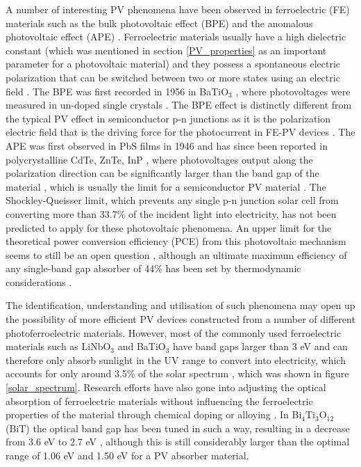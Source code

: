 A number of interesting PV phenomena have been observed in ferroelectric (FE) materials  such as the bulk photovoltaic effect (BPE) and the anomalous photovoltaic effect (APE) \cite{keith}. Ferroelectric materials usually have a high dielectric constant (which was mentioned in section \ref{PV_properties} as an important parameter for a photovoltaic material) and they possess a spontaneous electric polarization that can be switched between two or more states using an electric field \cite{new_FE_PV_1}.
The BPE was first recorded in 1956 in BaTiO$_3$ \cite{keith_46}, where photovoltages were measured in un-doped single crystals \cite{keith}.
The BPE effect is distinctly different from the typical PV effect in semiconductor
p-n junctions as it is the polarization electric field that is the driving force for the photocurrent in FE-PV devices \cite{FE_PV_rev1}. 
The APE was first observed in PbS films in 1946 \cite{keith_54} and has since been reported in polycrystalline CdTe, ZnTe, InP \cite{keith_55, keith_56, keith_57}, where photovoltages output along the polarization direction can be significantly larger than the band gap of the material \cite{FE_PV_rev1}, which is usually the limit for a semiconductor PV material \cite{keith}. 
The Shockley-Queisser limit, which prevents any single p-n junction solar cell from converting more than 33.7\% of the incident light into electricity, has not been predicted to apply for these photovoltaic phenomena. An upper limit for the theoretical power conversion efficiency (PCE) from this photovoltaic mechanism seems to still be an open question \cite{new_FE_PV}, although an ultimate maximum efficiency of any single-band gap absorber of 44\% has been set by thermodynamic considerations \cite{SQ_1961}. %

The identification, understanding and utilisation of such phenomena may open up the possibility of more efficient PV devices constructed from a number of different photoferroelectric materials. However, most of the commonly used ferroelectric materials such as LiNbO$_3$ and BaTiO$_3$ have band gaps larger than 3 eV and can therefore only absorb sunlight in the UV range to convert into electricity, which accounts for only around 3.5\% of the solar spectrum \cite{FE_PV_rev1}, which was shown in figure \ref{solar_spectrum}. Research efforts have also gone into adjusting the optical absorption of ferroelectric materials without influencing the ferroelectric properties of the material through chemical doping or alloying \cite{FE_PV_rev1}. In Bi$_4$Ti$_3$O$_{12}$ (BiT) the optical band gap has been tuned in such a way, resulting in a decrease from 3.6 eV to 2.7 eV \cite{FE_PV_rev1_83}, although this is still considerably larger than the optimal range of 1.06 eV and 1.50 eV \cite{CZTS_book} for a PV absorber material.

